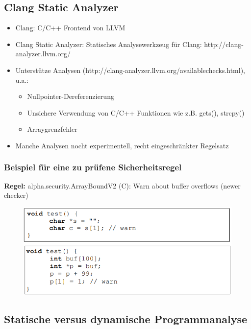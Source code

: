 \documentclass[openany]{book}
\begin{document}
\subsection{Clang Static Analyzer}

\begin{itemize}
    \item Clang: C/C++ Frontend von LLVM
    \item Clang Static Analyzer: Statisches Analysewerkzeug für Clang:  http://clang-analyzer.llvm.org/
    \item Unterstütze Analysen (http://clang-analyzer.llvm.org/available\textunderscore checks.html), u.a.:
    \begin{itemize}
        \item Nullpointer-Dereferenzierung
        \item Unsichere Verwendung von C/C++ Funktionen wie z.B. gets(), strcpy()
        \item Arraygrenzfehler
    \end{itemize}
    \item Manche Analysen nocht experimentell, recht eingeschränkter Regelsatz
\end{itemize}

\newpage

\subsubsection{Beispiel für eine zu prüfene Sicherheitsregel}

\textbf{Regel:} alpha.security.ArrayBoundV2 (C): Warn about buffer overflows (newer checker)

\begin{figure}[h!]
    \centering
    \includegraphics[width=\linewidth]{Pics/LLVM_Example.PNG}
\end{figure}

\subsection{Statische versus dynamische Programmanalyse}
\end{document}
